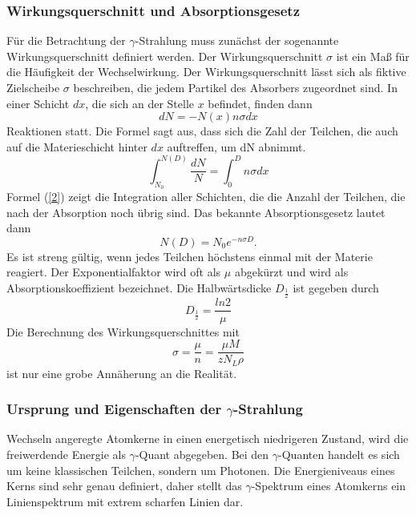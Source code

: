 \documentclass[11pt,ngerman,a4paper]{article}
\begin{document}
\subsubsection{Wirkungsquerschnitt und Absorptionsgesetz}
Für die Betrachtung der $\gamma$-Strahlung muss zunächst der sogenannte Wirkungsquerschnitt definiert werden. \newline
Der Wirkungsquerschnitt $\sigma$ ist ein Maß für die Häufigkeit der Wechselwirkung. Der Wirkungsquerschnitt lässt sich als fiktive Zielscheibe $\sigma$ beschreiben, die jedem Partikel des Absorbers zugeordnet sind. In einer Schicht $dx$, die sich an der Stelle $x$ befindet, finden dann
\begin{equation}
dN = -N(x)n\sigma dx
\label{1}
\end{equation}
Reaktionen statt. Die Formel sagt aus, dass sich die Zahl der Teilchen, die auch auf die Materieschicht hinter $dx$ auftreffen, um dN abnimmt.
\begin{equation}
\int_{N_0}^{N(D)} \frac{dN}{N} = \int_0^D n\sigma dx
\label{2}
\end{equation}
Formel (\ref{2}) zeigt die Integration aller Schichten, die die Anzahl der Teilchen, die nach der Absorption noch übrig sind. Das bekannte Absorptionsgesetz lautet dann
\begin{equation}
N(D) = N_0e^{-n\sigma D}.
\label{3}
\end{equation}
Es ist streng gültig, wenn jedes Teilchen höchstens einmal mit der Materie reagiert. Der Exponentialfaktor wird oft als $\mu$ abgekürzt und wird als Absorptionskoeffizient bezeichnet.
Die Halbwärtsdicke $D_{\frac{1}{2}}$ ist gegeben durch
\begin{equation}
D_{\frac{1}{2}} = \frac{ln 2}{\mu}
\label{4}
\end{equation}
Die Berechnung des Wirkungsquerschnittes mit
\begin{equation}
\sigma = \frac{\mu}{n} = \frac{\mu M}{zN_L\rho}
\label{5}
\end{equation}
ist nur eine grobe Annäherung an die Realität.
\subsubsection{Ursprung und Eigenschaften der $\gamma$-Strahlung}
Wechseln angeregte Atomkerne in einen energetisch niedrigeren Zustand, wird die freiwerdende Energie als $\gamma$-Quant abgegeben. Bei den $\gamma$-Quanten handelt es sich um keine klassischen Teilchen, sondern um Photonen. Die Energieniveaus eines Kerns sind sehr genau definiert, daher stellt das  $\gamma$-Spektrum eines Atomkerns ein Linienspektrum mit extrem scharfen Linien dar.
\end{document}
